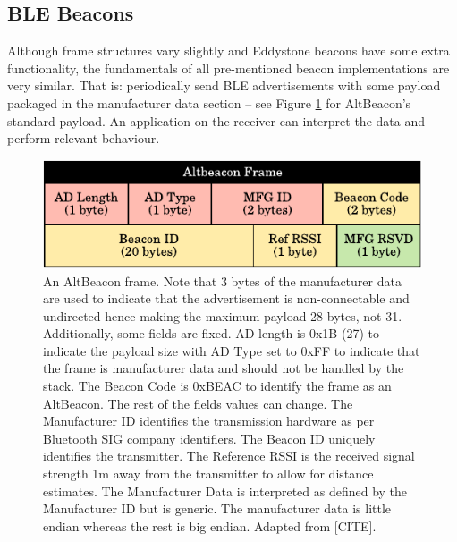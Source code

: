 \documentclass[conference]{IEEEtran} %
\begin{document}
\subsection{BLE Beacons}
Although frame structures vary slightly and Eddystone beacons have some extra functionality, the fundamentals of all pre-mentioned beacon implementations are very similar. That is: periodically send BLE advertisements with some payload packaged in the manufacturer data section -- see Figure \ref{fig:altbeacon_frame} for AltBeacon's standard payload. An application on the receiver can interpret the data and perform relevant behaviour.


\begin{figure}[H]
    \centering
   	\includegraphics[scale=0.75]{Figures/altbeacon_frame}
    \caption[Altbeacon frame]{
  An AltBeacon frame. Note that 3 bytes of the manufacturer data are used to indicate that the advertisement is non-connectable and undirected hence making the maximum payload 28 bytes, not 31. Additionally, some fields are fixed. AD length is 0x1B (27) to indicate the payload size with AD Type set to 0xFF to indicate that the frame is manufacturer data and should not be handled by the stack. The Beacon Code is 0xBEAC to identify the frame as an AltBeacon. The rest of the fields values can change. The Manufacturer ID identifies the transmission hardware as per Bluetooth SIG company identifiers. The Beacon ID uniquely identifies the transmitter. The Reference RSSI is the received signal strength 1m away from the transmitter to allow for distance estimates. The Manufacturer Data is interpreted as defined by the Manufacturer ID but is generic. The manufacturer data is little endian whereas the rest is big endian. Adapted from [CITE].
    }
    \label{fig:altbeacon_frame}
\end{figure}
\end{document}
